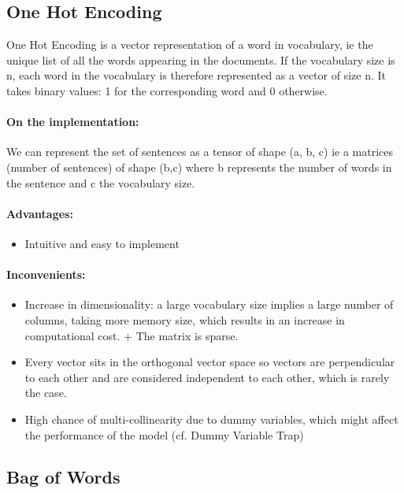 \documentclass{article}
\begin{document}
\subsection{One Hot Encoding}

One Hot Encoding is a vector representation of a word in vocabulary, ie the unique list of all the words appearing in the documents.
If the vocabulary size is n, each word in the vocabulary is therefore represented as a vector of size n. It takes binary values: 1 for the corresponding word and 0 otherwise.

\paragraph{On the implementation:}

We can represent the set of sentences as a tensor of shape (a, b, c) ie a matrices (number of sentences) of shape (b,c) where b represents the number of words in the sentence and c the vocabulary size.

\paragraph{Advantages:}

\begin{itemize}
  \item Intuitive and easy to implement
\end{itemize}

\paragraph{Inconvenients:}

\begin{itemize}
  \item Increase in dimensionality: a large vocabulary size implies a large number of columns, taking more memory size, which results in an increase in computational cost. + The matrix is sparse.
  \item Every vector sits in the orthogonal vector space so vectors are perpendicular to each other and are considered independent to each other, which is rarely the case.
  \item High chance of multi-collinearity due to dummy variables, which might affect the performance of the model (cf. Dummy Variable Trap)
\end{itemize}

\subsection{Bag of Words}
\end{document}
